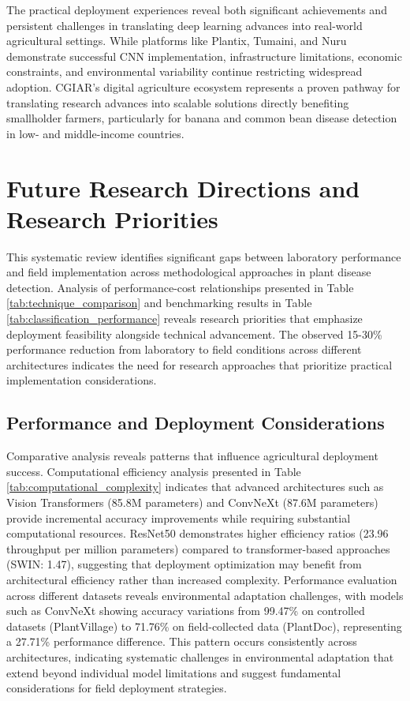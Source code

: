 \documentclass[sn-mathphys]{sn-jnl}
\theoremstyle{thmstyleone}%
\theoremstyle{thmstyletwo}%
\theoremstyle{thmstylethree}%
\begin{document}
\par The practical deployment experiences reveal both significant achievements and persistent challenges in translating deep learning advances into real-world agricultural settings. While platforms like Plantix, Tumaini, and Nuru demonstrate successful CNN implementation, infrastructure limitations, economic constraints, and environmental variability continue restricting widespread adoption. CGIAR's digital agriculture ecosystem represents a proven pathway for translating research advances into scalable solutions directly benefiting smallholder farmers, particularly for banana and common bean disease detection in low- and middle-income countries.

\section{Future Research Directions and Research Priorities} \label{sec:frd}
This systematic review identifies significant gaps between laboratory performance and field implementation across methodological approaches in plant disease detection. Analysis of performance-cost relationships presented in Table \ref{tab:technique_comparison} and benchmarking results in Table \ref{tab:classification_performance} reveals research priorities that emphasize deployment feasibility alongside technical advancement. The observed 15-30\% performance reduction from laboratory to field conditions across different architectures indicates the need for research approaches that prioritize practical implementation considerations.


\subsection{Performance and Deployment Considerations}

Comparative analysis reveals patterns that influence agricultural deployment success. Computational efficiency analysis presented in Table \ref{tab:computational_complexity} indicates that advanced architectures such as Vision Transformers (85.8M parameters) and ConvNeXt (87.6M parameters) provide incremental accuracy improvements while requiring substantial computational resources. ResNet50 demonstrates higher efficiency ratios (23.96 throughput per million parameters) compared to transformer-based approaches (SWIN: 1.47), suggesting that deployment optimization may benefit from architectural efficiency rather than increased complexity. Performance evaluation across different datasets reveals environmental adaptation challenges, with models such as ConvNeXt showing accuracy variations from 99.47\% on controlled datasets (PlantVillage) to 71.76\% on field-collected data (PlantDoc), representing a 27.71\% performance difference. This pattern occurs consistently across architectures, indicating systematic challenges in environmental adaptation that extend beyond individual model limitations and suggest fundamental considerations for field deployment strategies.
\end{document}
